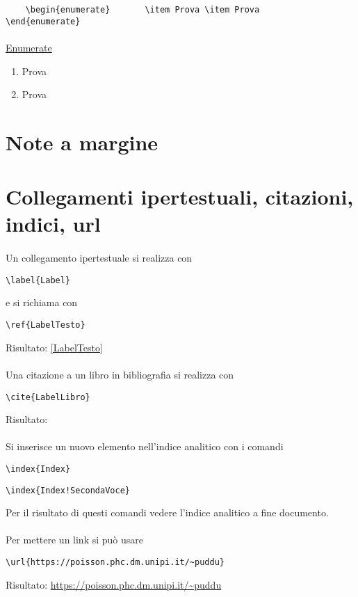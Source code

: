 \begin{verbatim}
	\begin{enumerate}		\item Prova \item Prova		\end{enumerate}
\end{verbatim}
\paragraph*{} \underline{Enumerate}
\begin{enumerate}
	\item Prova
	\item Prova
\end{enumerate}
\section{Note a margine}
	\lipsum[1]
	\lipsum[1]
	\lipsum[1]
	\lipsum[1]
\section{Collegamenti ipertestuali, citazioni, indici, url}
	\paragraph*{} Un collegamento ipertestuale si realizza con
\begin{verbatim}\label{Label}\end{verbatim}		
e si richiama con
 \begin{verbatim}\ref{LabelTesto}\end{verbatim}
 Risultato: \label{LabelTesto}\ref{LabelTesto}

\paragraph*{} Una citazione a un libro in bibliografia si realizza con
\begin{verbatim}\cite{LabelLibro}\end{verbatim}
	Risultato: \cite{Label}

\paragraph*{} Si inserisce un nuovo elemento nell'indice analitico con i comandi
\begin{verbatim}\index{Index}\end{verbatim}
\begin{verbatim}\index{Index!SecondaVoce}
\end{verbatim}
Per il risultato di questi comandi vedere l'indice analitico a fine documento. 
\paragraph*{} Per mettere un link si può usare
\begin{verbatim}\url{https://poisson.phc.dm.unipi.it/~puddu}\end{verbatim}
Risultato: \url{https://poisson.phc.dm.unipi.it/~puddu}